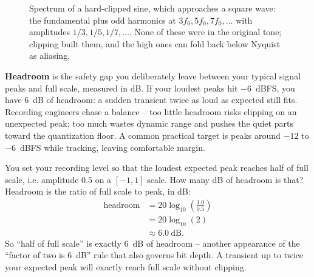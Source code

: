 \begin{figure}[H]
\centering
{}
\caption{Spectrum of a hard-clipped sine, which approaches a square wave: the fundamental plus odd
harmonics at $3f_0, 5f_0, 7f_0, \dots$ with amplitudes $1/3, 1/5, 1/7, \dots$. None of these were
in the original tone; clipping built them, and the high ones can fold back below Nyquist as
aliasing.}
\label{ch26:fig-clipspectrum}
\end{figure}

\textbf{Headroom} is the safety gap you deliberately leave between your typical signal peaks and
full scale, measured in dB. If your loudest peaks hit $-6$~dBFS, you have $6$~dB of headroom: a
sudden transient twice as loud as expected still fits. Recording engineers chase a balance -- too
little headroom risks clipping on an unexpected peak; too much wastes dynamic range and pushes the
quiet parts toward the quantization floor. A common practical target is peaks around $-12$ to
$-6$~dBFS while tracking, leaving comfortable margin.

\begin{example}
\label{ch26:ex-headroom}
You set your recording level so that the loudest expected peak reaches half of full scale, i.e.
amplitude $0.5$ on a $[-1,1]$ scale. How many dB of headroom is that? Headroom is the ratio of
full scale to peak, in dB:
\begin{align*}
  \text{headroom} &= 20\log_{10}\!\left(\frac{1.0}{0.5}\right) \\
                   &= 20\log_{10}(2) \\
                   &\approx 6.0~\text{dB}.
\end{align*}
So ``half of full scale'' is exactly $6$~dB of headroom -- another appearance of the
``factor of two is $6$~dB'' rule that also governs bit depth. A transient up to twice your
expected peak will exactly reach full scale without clipping.
\end{example}

